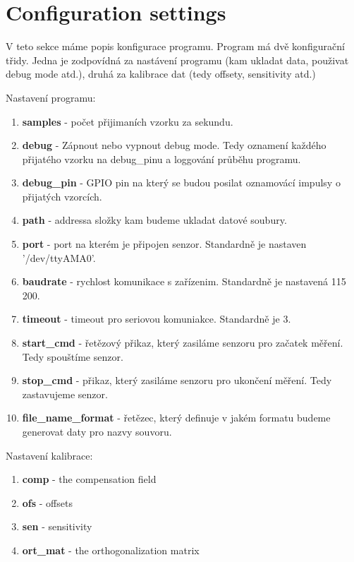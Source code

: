 \documentclass[12pt]{article}
\begin{document}
\section{Configuration settings}
\par V teto sekce máme popis konfigurace programu. Program má dvě
konfigurační třidy. Jedna je zodpovídná za nastávení programu (kam ukladat
data, použivat debug mode atd.), druhá za kalibrace dat (tedy offsety,
sensitivity atd.)
\par Nastavení programu:
\begin{enumerate}
    \item \textbf{samples} - počet přijimaních vzorku za sekundu.
    \item \textbf{debug} - Zápnout nebo vypnout debug mode. Tedy oznamení 
        každého přijatého vzorku na debug\_pinu a loggování průběhu programu.
    \item \textbf{debug\_pin} - GPIO pin na který se budou posilat oznamovácí
        impulsy o přijatých vzorcích.
    \item \textbf{path} - addressa složky kam budeme ukladat datové soubury.
    \item \textbf{port} - port na kterém je připojen senzor. Standardně je
        nastaven '/dev/ttyAMA0'.
    \item \textbf{baudrate} - rychlost komunikace s zařízenim. Standardně je
        nastavená 115 200.
    \item \textbf{timeout} - timeout pro seriovou komuniakce. Standardně je 3.
    \item \textbf{start\_cmd} - řetězový přikaz, který zasiláme senzoru pro
        začatek měření. Tedy spouštíme senzor.
    \item \textbf{stop\_cmd} - přikaz, který zasiláme senzoru pro ukončení
        měření. Tedy zastavujeme senzor.
    \item \textbf{file\_name\_format} - řetězec, který definuje v jakém formatu
        budeme generovat daty pro nazvy souvoru.
\end{enumerate}
\par Nastavení kalibrace:
\begin{enumerate}
    \item \textbf{comp} - the compensation field
    \item \textbf{ofs} - offsets
    \item \textbf{sen} - sensitivity
    \item \textbf{ort\_mat} - the orthogonalization matrix
\end{enumerate}
\end{document}
